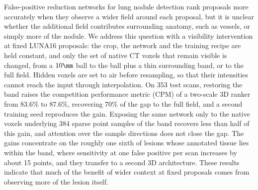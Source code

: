 False-positive reduction networks for lung nodule detection rank proposals more accurately when they observe a wider field around each proposal, but it is unclear whether the additional field contributes surrounding anatomy, such as vessels, or simply more of the nodule. We address this question with a visibility intervention at fixed LUNA16 proposals: the crop, the network and the training recipe are held constant, and only the set of native CT voxels that remain visible is changed, from a $10\mm$ ball to the ball plus a thin surrounding band, or to the full field. Hidden voxels are set to air before resampling, so that their intensities cannot reach the input through interpolation. On 353 test scans, restoring the band raises the competition performance metric (CPM) of a two-scale 3D ranker from 83.6\% to 87.6\%, recovering 70\% of the gap to the full field, and a second training seed reproduces the gain. Exposing the same network only to the native voxels underlying 384 sparse point samples of the band recovers less than half of this gain, and attention over the sample directions does not close the gap. The gains concentrate on the roughly one sixth of lesions whose annotated tissue lies within the band, where sensitivity at one false positive per scan increases by about 15 points, and they transfer to a second 3D architecture. These results indicate that much of the benefit of wider context at fixed proposals comes from observing more of the lesion itself.
